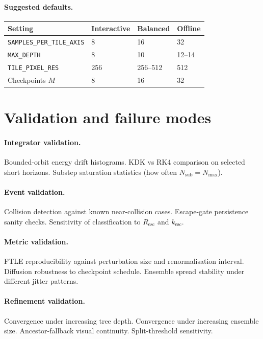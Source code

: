 \documentclass[11pt]{report}
\begin{document}
\paragraph{Suggested defaults.}

\begin{center}
\begin{tabular}{llll}
\toprule
Setting & Interactive & Balanced & Offline \\
\midrule
\texttt{SAMPLES\_PER\_TILE\_AXIS} & 8 & 16 & 32 \\
\texttt{MAX\_DEPTH} & 8 & 10 & 12--14 \\
\texttt{TILE\_PIXEL\_RES} & 256 & 256--512 & 512 \\
Checkpoints $M$ & 8 & 16 & 32 \\
\bottomrule
\end{tabular}
\end{center}

\section{Validation and failure modes}
\label{sec:validation}

\paragraph{Integrator validation.} Bounded-orbit energy drift histograms. KDK vs RK4 comparison on selected short horizons. Substep saturation statistics (how often $N_{\mathrm{sub}}=N_{\max}$).

\paragraph{Event validation.} Collision detection against known near-collision cases. Escape-gate persistence sanity checks. Sensitivity of classification to $R_{\mathrm{esc}}$ and $k_{\mathrm{esc}}$.

\paragraph{Metric validation.} FTLE reproducibility against perturbation size and renormalisation interval. Diffusion robustness to checkpoint schedule. Ensemble spread stability under different jitter patterns.

\paragraph{Refinement validation.} Convergence under increasing tree depth. Convergence under increasing ensemble size. Ancestor-fallback visual continuity. Split-threshold sensitivity.
\end{document}
